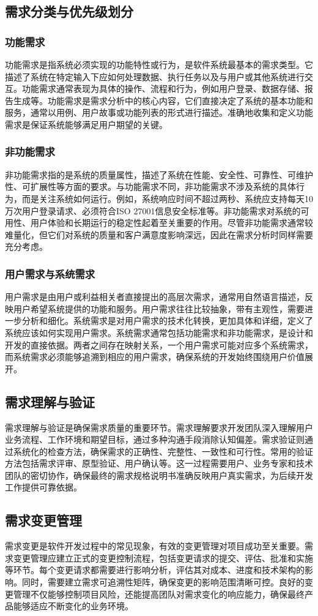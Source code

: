 \subsection{需求分类与优先级划分}

\subsubsection{功能需求}

功能需求是指系统必须实现的功能特性或行为，是软件系统最基本的需求类型。它描述了系统在特定输入下应如何处理数据、执行任务以及与用户或其他系统进行交互。功能需求通常表现为具体的操作、流程和行为，例如用户登录、数据存储、报告生成等。功能需求是需求分析中的核心内容，它们直接决定了系统的基本功能和服务，通常以用例、用户故事或功能列表的形式进行描述。准确地收集和定义功能需求是保证系统能够满足用户期望的关键。

\subsubsection{非功能需求}

非功能需求指的是系统的质量属性，描述了系统在性能、安全性、可靠性、可维护性、可扩展性等方面的要求。与功能需求不同，非功能需求不涉及系统的具体行为，而是关注系统如何运行。例如，系统响应时间不超过两秒、系统应支持每天10万次用户登录请求、必须符合ISO 27001信息安全标准等。非功能需求对系统的可用性、用户体验和长期运行的稳定性起着至关重要的作用。尽管非功能需求通常较难量化，但它们对系统的质量和客户满意度影响深远，因此在需求分析时同样需要充分考虑。

\subsubsection{用户需求与系统需求}

用户需求是由用户或利益相关者直接提出的高层次需求，通常用自然语言描述，反映用户希望系统提供的功能和服务。用户需求往往比较抽象，带有主观性，需要进一步分析和细化。系统需求是对用户需求的技术化转换，更加具体和详细，定义了系统应该如何实现用户需求。系统需求通常包括功能需求和非功能需求，是设计和开发的直接依据。两者之间存在映射关系，一个用户需求可能对应多个系统需求，而系统需求必须能够追溯到相应的用户需求，确保系统的开发始终围绕用户价值展开。

\subsection{需求理解与验证}

需求理解与验证是确保需求质量的重要环节。需求理解要求开发团队深入理解用户业务流程、工作环境和期望目标，通过多种沟通手段消除认知偏差。需求验证则通过系统化的检查方法，确保需求的正确性、完整性、一致性和可行性。常用的验证方法包括需求评审、原型验证、用户确认等。这一过程需要用户、业务专家和技术团队的密切协作，确保最终的需求规格说明书准确反映用户真实需求，为后续开发工作提供可靠依据。

\subsection{需求变更管理}

需求变更是软件开发过程中的常见现象，有效的变更管理对项目成功至关重要。需求变更管理应建立正式的变更控制流程，包括变更请求的提交、评估、批准和实施等环节。每个变更请求都需要进行影响分析，评估其对成本、进度和技术架构的影响。同时，需要建立需求可追溯性矩阵，确保变更的影响范围清晰可控。良好的变更管理不仅能够控制项目风险，还能提高团队对需求变化的响应能力，确保最终产品能够适应不断变化的业务环境。